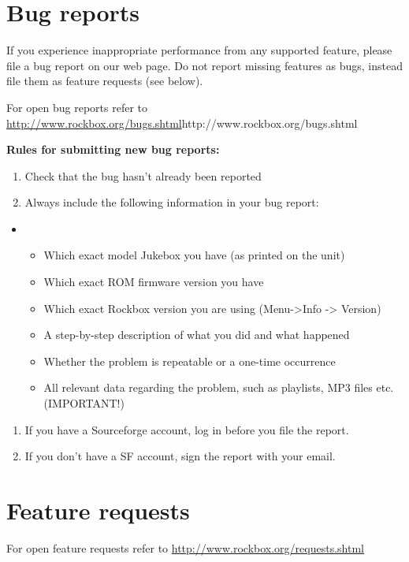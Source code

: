 \section{Bug reports}
If you experience inappropriate performance from any supported feature,
please file a bug report on our web page. Do not report missing
features as bugs, instead file them as feature requests (see below).

For open bug reports refer to
\url{http://www.rockbox.org/bugs.shtml}{http://www.rockbox.org/bugs.shtml}

{\bfseries
Rules for submitting new bug reports:}

\begin{enumerate}
\item  Check that the bug hasn't already been reported
\item  Always include the following information in your bug report:
\end{enumerate}
\begin{itemize}
\item \begin{itemize}
\item  Which exact model Jukebox you have (as printed on the unit)
\item  Which exact ROM firmware version you have
\item  Which exact Rockbox version you are using
(Menu{}-{\textgreater}Info {}-{\textgreater} Version)
\item  A step{}-by{}-step description of what you did and what happened
\item  Whether the problem is repeatable or a one{}-time
\foreignlanguage{english}{occurrence}
\item  All relevant data regarding the problem, such as playlists, MP3
files etc. (IMPORTANT!) 
\end{itemize}
\end{itemize}
\begin{enumerate}
\item  If you have a Sourceforge account, log
in before you file the report.
\item  If you don't have a SF account, sign the report
with your email. 
\end{enumerate}

\section{Feature requests}
For open feature requests refer to
\url{http://www.rockbox.org/requests.shtml}

